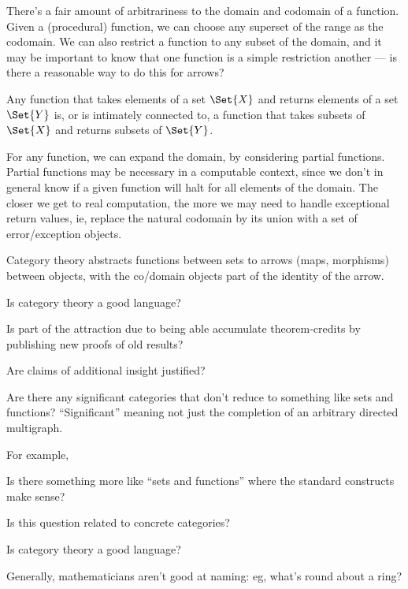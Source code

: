 \documentclass[11pt,openany]{article}
\begin{document}
There's a fair amount of arbitrariness 
to the domain and codomain of a function.
Given a (procedural) function,
we can choose any superset of the range as the codomain.
We can also restrict a function to any subset of the domain,
and it may be important to know that one function is a simple 
restriction another --- is there a reasonable way to do this
for arrows?

Any function that takes elements of a set $\Set{X}$
and returns elements of a set $\Set{Y}$
is, or is intimately connected to, 
a function that takes subsets of $\Set{X}$ and returns
subsets of $\Set{Y}$.

For any function, we can expand the domain, by considering partial
functions. 
Partial functions may be necessary in a computable context,
since we don't in general know if a given function will
halt for all elements of the domain.
The closer we get to real computation, the more we may need to
handle exceptional return values, ie, replace the natural
codomain by its union with a set of error/exception objects.

Category theory abstracts functions between sets to
arrows (maps, morphisms) between objects,
with the co/domain objects part of the identity of the arrow.

\label{sec:Right-abstraction}

Is category theory a good language?~\cite{wiki:Abstract-nonsense-2020}

Is part of the attraction due to being able accumulate
theorem-credits by publishing
new proofs of old results?

Are claims of additional insight justified?

Are there any significant categories 
that don't reduce to something like sets and functions?
``Significant'' meaning not just the completion of an arbitrary
directed multigraph.

For example, 

Is there something more like ``sets and functions'' where
the standard constructs make sense?

Is this question related to concrete 
categories?~\cite{wiki:concrete-category-2020}

\label{sec:Naming}

Is category theory a good language?~\cite{wiki:Abstract-nonsense-2020}

Generally, mathematicians aren't good at naming:
eg, what's round about a ring?
\end{document}
